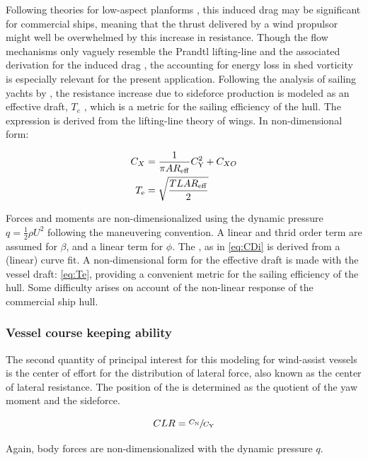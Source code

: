 \documentclass[twoside,twocolumn]{article}
\begin{document}
Following theories for low-aspect planforms \cite{Hoerner1985,Jones1946}, this induced drag may be significant for commercial ships, meaning that the thrust delivered by a wind propulsor might well be overwhelmed by this increase in resistance. Though the flow mechanisms only vaguely resemble the Prandtl lifting-line and the associated derivation for the induced drag \cite{Prandtl1918}, the accounting for energy loss in shed vorticity is especially relevant for the present application. Following the analysis of sailing yachts by \citet{Gerritsma1992}, the resistance increase due to sideforce production is modeled as an effective draft, $T_{e}$ \cite{Gerritsma1993}, which is a metric for the sailing efficiency of the hull. The expression is derived from the lifting-line theory of wings. In non-dimensional form:

\begin{subequations}
	\begin{align}
	C_{X}&=\frac{1}{\pi AR_\mathrm{eff}}C_\mathrm{Y}^2+C_{XO} 
	\label{eq:CDi}\\
	T_\mathrm{e}&=\sqrt{\dfrac{TLAR_\mathrm{eff}}{2}} 
	\label{eq:Te}
	\end{align}
\end{subequations}

\noindent
Forces and moments are non-dimensionalized using the dynamic pressure $q=\frac{1}{2}\rho U^2 $ following the maneuvering convention. A linear and thrid order term are assumed for $\beta$, and a linear term for $\phi$. The \ARe, as in \cref{eq:CDi} is derived from a (linear) curve fit. A non-dimensional form for the effective draft \Te is made with the vessel draft: \TeT \cref{eq:Te}, providing a convenient metric for the sailing efficiency of the hull. Some difficulty arises on account of the non-linear response of the commercial ship hull.

\subsubsection{Vessel course keeping ability}
The second quantity of principal interest for this modeling for wind-assist vessels is the center of effort for the distribution of lateral force, also known as the center of lateral resistance. The position of the \CLR is determined as the quotient of the yaw moment and the sideforce.

\begin{equation}
CLR=\sfrac{C_\mathrm{N}}{C_\mathrm{Y}}
\end{equation}

\noindent
Again, body forces are non-dimensionalized with the dynamic pressure $q$.
\end{document}
